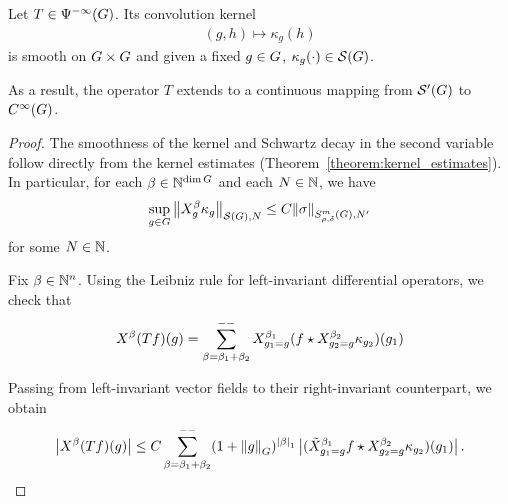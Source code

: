 \begin{proposition}
\label{proposition:smoothing_operators}
    Let $T \in {\Psi^{-\infty} (G)}$.
    Its convolution kernel
    \begin{align*}
        (g, h) \mapsto \kappa_g(h)
    \end{align*}
    is smooth on $G \times G$ and given a fixed $g \in G$, $\kappa_g(\cdot) \in {\mathcal{S} (G)}$.

    As a result,
    the operator $T$ extends to a continuous mapping from ${\mathcal{S}' (G)}$ to ${C^\infty(G)}$.
\end{proposition}
\begin{proof}
    The smoothness of the kernel and Schwartz decay in the second variable follow directly from the kernel estimates (Theorem~\ref{theorem:kernel_estimates}).
    In particular,
    for each $\beta \in \mathbb{N}^{\dim G}$ and each $N \in \mathbb{N}$,
    we have
    \begin{align}
        \sup_{g \in \Group}
        \seminorm [\Schwartz \Group] N {\LeftDifferentialOperator [g] \beta \kappa_g}
        \leq
        C
        \SymbolSemiNorm m {\rho, \delta} {N'} {\sigma}
        \label{eq:bound_on_Schwartz_seminorm_of_smoothing_kernel}
    \end{align}
    for some $N \in \mathbb{N}$.

    Fix $\beta \in \mathbb{N}^n$.
    Using the Leibniz rule for left-invariant differential operators,
    we check that
    \begin{align*}
        \LeftDifferentialOperator \beta (T f)(g)
        = \lcsum{\beta = \beta_1 + \beta_2}
        \LeftDifferentialOperator [g_1 = g] {\beta_1}
        (\conv f {\LeftDifferentialOperator [g_2 = g] {\beta_2} \kappa_{g_2}})(g_1)
    \end{align*}

    Passing from left-invariant vector fields to their right-invariant counterpart,
    we obtain
    \begin{align*}
        \abs {\LeftDifferentialOperator \beta (T f)(g)}
        \leq
        C
        \lcsum{\beta = \beta_1 + \beta_2}
        (1 + \norm [\Group] g)^{\abs \beta_1}
        \abs {(\conv {\RightDifferentialOperator [g_1 = g] {\beta_1} f} {\LeftDifferentialOperator [g_2 = g] {\beta_2} \kappa_{g_2}})(g_1)}.
    \end{align*}


\end{proof}
